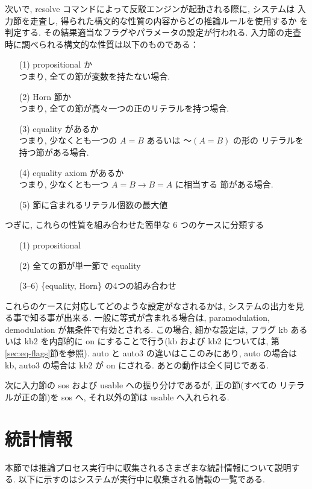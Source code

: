 次いで, resolve コマンドによって反駁エンジンが起動される際に, システムは
入力節を走査し, 得られた構文的な性質の内容からどの推論ルールを使用するか
を判定する. その結果適当なフラグやパラメータの設定が行われる.
入力節の走査時に調べられる構文的な性質は以下のものである：
\begin{enumerate}
\item[(1)] propositional か\\
  つまり, 全ての節が変数を持たない場合.
\item[(2)] Horn 節か\\
  つまり, 全ての節が高々一つの正のリテラルを持つ場合.
\item[(3)] equality があるか\\
  つまり, 少なくとも一つの $A = B$ あるいは $〜(A = B)$ の形の
  リテラルを持つ節がある場合.
\item[(4)] equality axiom があるか\\
  つまり, 少なくとも一つ $A = B \rightarrow B = A$ に相当する
  節がある場合.
\item[(5)] 節に含まれるリテラル個数の最大値
\end{enumerate}
つぎに, これらの性質を組み合わせた簡単な 6 つのケースに分類する
\begin{enumerate}
\item[(1)] propositional
\item[(2)] 全ての節が単一節で equality 
\item[(3--6)] \{equality, Horn\} の4つの組み合わせ
\end{enumerate}
これらのケースに対応してどのような設定がなされるかは, システムの出力を見
る事で知る事が出来る. 一般に等式が含まれる場合は, paramodulation, 
demodulation が無条件で有効とされる. この場合, 細かな設定は, フラグ kb
あるいは kb2 を内部的に on にすることで行う(kb および kb2 については, 第
\ref{sec:eq-flags}節を参照). 
auto と auto3 の違いはここのみにあり, auto の場合は kb, auto3 の場合は
kb2 が on にされる. あとの動作は全く同じである.

次に入力節の sos および usable への振り分けであるが, 正の節(すべての
リテラルが正の節)を sos へ, それ以外の節は usable へ入れられる.

\section{統計情報}
\label{sec:statistics}
本節では推論プロセス実行中に収集されるさまざまな統計情報について説明する.
以下に示すのはシステムが実行中に収集される情報の一覧である.

